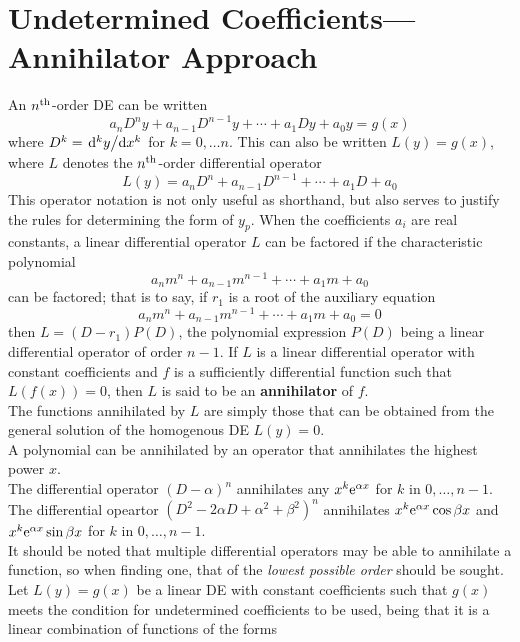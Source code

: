 \documentclass[./Differential Equations]{subfiles}
\begin{document}
	\section{Undetermined Coefficients---Annihilator Approach}
		An \(n^{\text{th}}\)-order DE can be written
			\[a_nD^ny + a_{ n- 1}D^{n - 1}y + \cdots + a_1Dy + a_0y = g(x)\]
			where \(D^k = \dv*[k]{y}{x}\) for \(k = 0, \ldots n\). This can also be written \(L(y) = g(x)\), where \(L\) denotes the \(n^{\text{th}}\)-order differential operator
			\[L(y) = a_nD^n + a_{n - 1}D^{n - 1} + \cdots + a_1D + a_0\]
			This operator notation is not only useful as shorthand, but also serves to justify the rules for determining the form of \(y_p\).
			When the coefficients \(a_i\) are real constants, a linear differential operator \(L\) can be factored if the characteristic polynomial
				\[a_nm^n + a_{n - 1}m^{n - 1} + \cdots + a_1m + a_0\]
				can be factored; that is to say, if \(r_1\) is a root of the auxiliary equation
				\[a_nm^n + a_{n - 1}m^{n - 1} + \cdots + a_1m + a_0 = 0\]
				then \(L = (D - r_1)P(D)\), the polynomial expression \(P(D)\) being a linear differential operator of order \(n - 1\).
			If \(L\) is a linear differential operator with constant coefficients and \(f\) is a sufficiently differential function such that \(L(f(x)) = 0\), then \(L\) is said to be an \textbf{annihilator} of \(f\). \\
			The functions annihilated by \(L\) are simply those that can be obtained from the general solution of the homogenous DE \(L(y) = 0\). \\
			A polynomial can be annihilated by an operator that annihilates the highest power \(x\). \\
			The differential operator \((D - \alpha)^n\) annihilates any \(x^k\text{e}^{\alpha x}\) for \(k\) in \(0, \ldots, n - 1\). \\
			The differential opeartor \((D^2 - 2\alpha D + \alpha^2 + \beta^2)^n\) annihilates \(x^k\text{e}^{\alpha x}\cos\beta x\) and \(x^k\text{e}^{\alpha x}\sin\beta x\) for \(k\) in \(0, \ldots, n - 1\). \\
			It should be noted that multiple differential operators may be able to annihilate a function, so when finding one, that of the \textit{lowest possible order} should be sought.
			Let \(L(y) = g(x)\) be a linear DE with constant coefficients such that \(g(x)\) meets the condition for undetermined coefficients to be used, being that it is a linear combination of functions of the forms
\end{document}

